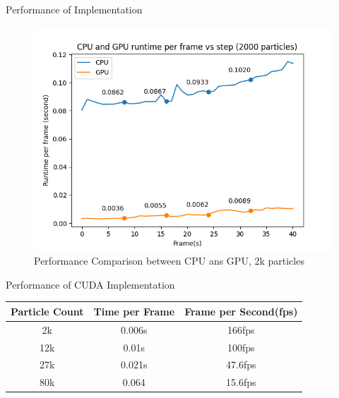 \documentclass[aspectratio=169,xcolor=dvipsnames]{beamer}
\begin{document}
\begin{frame}{Performance of Implementation}
    \begin{figure}
        \centering
        \includegraphics[width=0.6\linewidth]{../image/cpu-gpu-comprasion.png}
        \caption{Performance Comparison between CPU ans GPU, 2k particles}
    \end{figure}

\end{frame}


\begin{frame}{Performance of CUDA Implementation}
    \begin{center}
        \begin{tabular}{| c | c | c |}
          \hline
          Particle Count & Time per Frame & Frame per Second(fps)  \\
          \hline
          2k & 0.006s & 166fps \\
          \hline
          12k & 0.01s &  100fps \\
          \hline
          27k & 0.021s & 47.6fps \\
          \hline
          80k & 0.064 & 15.6fps \\
          \hline
        \end{tabular}
    \end{center}
\end{frame}
\end{document}
